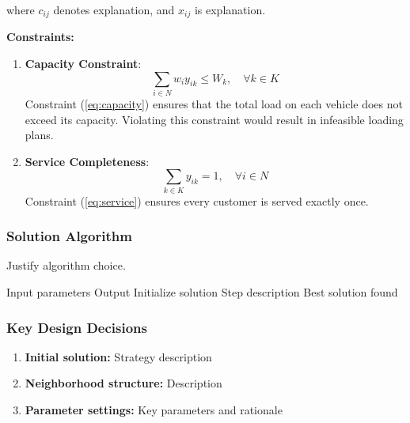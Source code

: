 \documentclass[12pt,letterpaper]{article}
\numberwithin{equation}{section}
\numberwithin{figure}{section}
\numberwithin{table}{section}
\begin{document}
where $c_{ij}$ denotes \textlangle explanation\textrangle, and $x_{ij}$ is \textlangle explanation\textrangle.

\textbf{Constraints:}

\begin{enumerate}[label=(\arabic*)]
    \item \textbf{Capacity Constraint}:
    \begin{equation}\label{eq:capacity}
        \sum_{i \in N} w_i y_{ik} \leq W_k, \quad \forall k \in K
    \end{equation}
    Constraint (\ref{eq:capacity}) ensures that the total load on each vehicle does not exceed its capacity. Violating this constraint would result in infeasible loading plans.

    \item \textbf{Service Completeness}:
    \begin{equation}\label{eq:service}
        \sum_{k \in K} y_{ik} = 1, \quad \forall i \in N
    \end{equation}
    Constraint (\ref{eq:service}) ensures every customer is served exactly once.
\end{enumerate}

\subsubsection{Solution Algorithm}

\textlangle Justify algorithm choice.\textrangle

\begin{algorithm}[H]
\caption{\textlangle Algorithm Name\textrangle}
\label{alg:main}
\begin{algorithmic}[1]
\REQUIRE \textlangle Input parameters\textrangle
\ENSURE \textlangle Output\textrangle
\STATE Initialize solution
    \STATE \textlangle Step description\textrangle
\ENDFOR
\RETURN Best solution found
\end{algorithmic}
\end{algorithm}

\subsubsection{Key Design Decisions}
\begin{enumerate}
    \item \textbf{Initial solution:} \textlangle Strategy description\textrangle
    \item \textbf{Neighborhood structure:} \textlangle Description\textrangle
    \item \textbf{Parameter settings:} \textlangle Key parameters and rationale\textrangle
\end{enumerate}
\end{document}
